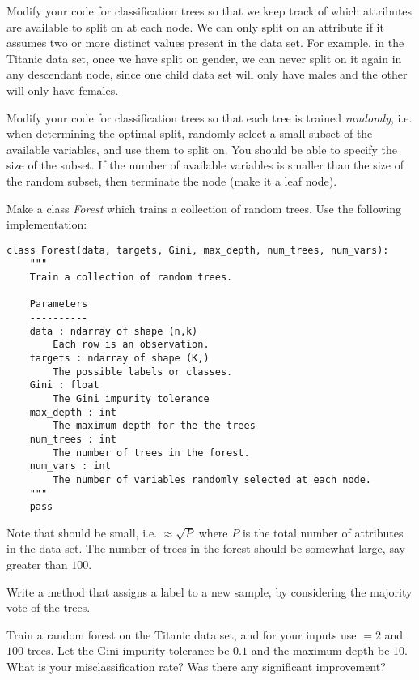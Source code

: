 
Modify your code for classification trees so that we keep track of which attributes are available to split on at each node. We can only split on an attribute if it assumes two or more distinct values present in the data set. For example, in the Titanic data set, once we have split on gender, we can never split on it again in any descendant node, since one child data set will only have males and the other will only have females.

Modify your code for classification trees so that each tree is trained \emph{randomly}, i.e. when determining the optimal split, randomly select a small subset of the available variables, and use them to split on. You should be able to specify the size of the subset. If the number of available variables is smaller than the size of the random subset, then terminate the node (make it a leaf node).

Make a class \emph{Forest} which trains a collection of random trees.  Use the following implementation:

\begin{lstlisting}
class Forest(data, targets, Gini, max_depth, num_trees, num_vars):
    """
    Train a collection of random trees.

    Parameters
    ----------
    data : ndarray of shape (n,k)
        Each row is an observation.
    targets : ndarray of shape (K,)
        The possible labels or classes.
    Gini : float
        The Gini impurity tolerance
    max_depth : int
        The maximum depth for the the trees
    num_trees : int
        The number of trees in the forest.
    num_vars : int
        The number of variables randomly selected at each node.
    """
    pass
\end{lstlisting}

Note that  should be small, i.e.  $ \approx \sqrt{P}$ where $P$ is the total number of attributes in the data set. The number of trees in the forest should be somewhat large, say greater than $100$.

Write a method that assigns a label to a new sample, by considering the majority vote of the trees.

Train a random forest on the Titanic data set, and for your inputs use  $ = 2$ and $100$ trees. Let the Gini impurity tolerance be $0.1$ and the maximum depth be $10$. What is your misclassification rate? Was there any significant improvement?
